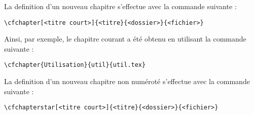 La definition d'un nouveau chapitre s'effectue avec la commande suivante :
\begin{verbatim}
\cfchapter[<titre court>]{<titre}{<dossier>}{<fichier>}
\end{verbatim}
Ainsi, par exemple, le chapitre courant a \'et\'e obtenu en utilisant la commande suivante :
\begin{verbatim}
\cfchapter{Utilisation}{util}{util.tex}
\end{verbatim}
La definition d'un nouveau chapitre non num\'erot\'e s'effectue avec la commande suivante :
\begin{verbatim}
\cfchapterstar[<titre court>]{<titre}{<dossier>}{<fichier>}
\end{verbatim}